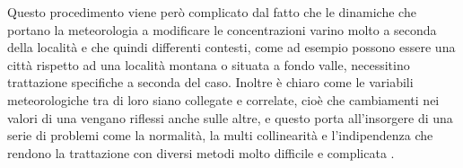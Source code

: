 \documentclass[a4paper]{report}
\begin{document}
Questo procedimento viene però complicato dal fatto che le dinamiche che portano la meteorologia a modificare le concentrazioni varino molto a seconda della località e che quindi differenti contesti, come ad esempio possono essere una città rispetto ad una località montana o situata a fondo valle, necessitino trattazione specifiche a seconda del caso. Inoltre è chiaro come le variabili meteorologiche tra di loro siano collegate e correlate, cioè che cambiamenti nei valori di una vengano riflessi anche sulle altre, e questo porta all'insorgere di una serie di problemi come la normalità, la multi collinearità e l'indipendenza che rendono la trattazione con diversi metodi molto difficile e complicata \cite{gunst1975regression}. 
\end{document}
